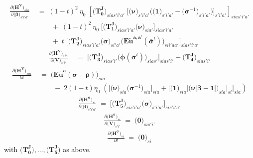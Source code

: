 \documentclass[11pt,fleqn]{article}
\newcommand{\bsigma}{\bm{\sigma}}
\newcommand{\bbeta}{\bm{\beta}}
\newcommand{\brho}{\bm{\rho}}
\newcommand{\bV}{\bm{V}}
\newcommand{\bnu}{\bm{\nu}}
\newcommand{\bzero}{\bm{0}}
\newcommand{\bone}{\bm{1}}
\newcommand{\tu}{\tilde{u}}
\begin{document}
\begin{align*}
	\frac{ \partial \biggl( \bm{H^{V}} \biggr)_{sia} }{ \partial \biggl( \bbeta \biggr)_{s'i'a'} } & \;=\; 
		(1-t)^2 \: \eta_0 \; \left[ \biggl( \bm{T_0^J} \biggr)_{sias'i'a'} \; \Biggl[ \biggl( \bnu \biggr)_{s'i'a'} \Biggl( \biggl( \bone \biggr)_{s'i'a'} - \biggl( \bsigma^{-1} \biggr)_{s'i'a'} \Biggr) \Biggr]_{s'i'a'} \right]_{sias'i'a'} \\
		& \qquad \;+\;  (1-t)^2 \: \eta_0 \; \Biggl[ \biggl( \bm{T_1^J} \biggr)_{sias'i'a'} \biggl( \bnu \biggr)_{sia'} \Biggr]_{sias'i'a'} \\
		& \qquad \;+\; t \; \Biggl[ \biggl( \bm{T_2^J} \biggr)_{sias'i'a'} \biggl( \bsigma \biggr)_{si'a'} \biggl( \bm{{E\tu^{a,a'}}}(\bar{\bsigma}^t) \biggr)_{sii'aa'} \Biggr]_{sias'i'a'}
\end{align*}
\begin{align*}
	\frac{ \partial \biggl( \bm{H^{V}} \biggr)_{sia} }{ \partial \biggl( \bV \biggr)_{s'i'} } & \;=\; 
		\Biggl[ \biggl( \bm{T_3^J} \biggr)_{sias'i'} \biggl( \bm{\phi}(\bar{\bsigma}^t) \biggr)_{sias'} \Biggr]_{sias'i'} - \biggl( \bm{T_4^J} \biggr)_{sias'i'}
\end{align*}
\begin{align*}
	\frac{ \partial \biggl( \bm{H^{V}} \biggr)_{sia} }{ \partial t } & \;=\; 
		\biggl( \bm{{E\tu^{a}}}(\bsigma-\brho) \biggr)_{sia} \\
		& \qquad \;-\; 2(1-t) \eta_0 \; \left( \Biggl[ \biggl( \bnu \biggr)_{sia} \biggl( \bsigma^{-1} \biggr)_{sia} \Biggr]_{sia} + \Biggl[ \biggl( \bone \biggr)_{sia} \Biggl[ \biggl( \bnu\bigl[\bbeta-\bone\bigr] \biggr)_{sia} \Biggr]_{si} \Biggr]_{sia} \right)
\end{align*}
\begin{align*}
	\frac{ \partial \biggl( \bm{H^{\sigma}} \biggr)_{si} }{ \partial \biggl( \bbeta \biggr)_{s'i'a'} } \;=\; 
	\Biggl[ \biggl( \bm{T_5^J} \biggr)_{sis'i'a'} \biggl( \bsigma \biggr)_{s'i'a'} \Biggr]_{sis'i'a'}
\end{align*}
\begin{align*}
	\frac{ \partial \biggl( \bm{H^{\sigma}} \biggr)_{si} }{ \partial \biggl( \bV \biggr)_{s'i'} } \;=\; \biggl( \bzero \biggr)_{sis'i'}
\end{align*}
\begin{align*}
	\frac{ \partial \biggl( \bm{H^{\sigma}} \biggr)_{si} }{ \partial t } \;=\; \biggl( \bzero \biggr)_{si}
\end{align*}
with $\biggl(\bm{T_0^J}\biggr), \dots, \biggl(\bm{T_5^J}\biggr)$ as above.
\end{document}
